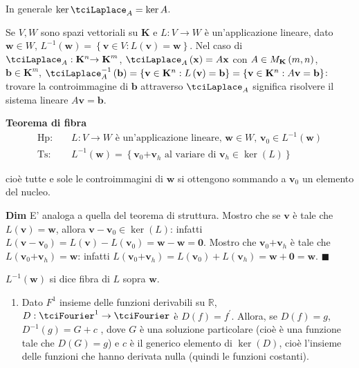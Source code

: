 \documentclass{article}
\begin{document}
In generale $\ker \tciLaplace _{A}=\ker A$.

Se $V,W$ sono spazi vettoriali su $\mathbf{K}$ e $L:V\rightarrow W$ \`{e}
un'applicazione lineare, dato $\mathbf{w}\in W$, $L^{-1}\left( \mathbf{w}%
\right) =\left\{ \mathbf{v}\in V:L\left( \mathbf{v}\right) =\mathbf{w}%
\right\} $. Nel caso di $\tciLaplace _{A}:\mathbf{K}^{n}\mathbf{\rightarrow K%
}^{m}$, $\tciLaplace _{A}\left( \mathbf{x}\right) =A\mathbf{x}$ con $A\in M_{%
\mathbf{K}}\left( m,n\right) $, $\mathbf{b\in K}^{m}$, $\tciLaplace
_{A}^{-1}\left( \mathbf{b}\right) =\left\{ \mathbf{v}\in \mathbf{K}%
^{n}:L\left( \mathbf{v}\right) =\mathbf{b}\right\} =\left\{ \mathbf{v}\in 
\mathbf{K}^{n}:A\mathbf{v}=\mathbf{b}\right\} $: trovare la controimmagine
di $\mathbf{b}$ attraverso $\tciLaplace _{A}$ significa risolvere il sistema
lineare $A\mathbf{v}=\mathbf{b}$.

\textbf{Teorema di fibra}%
\begin{eqnarray*}
\text{Hp}\text{: } &&L:V\rightarrow W\text{ \`{e} un'applicazione lineare, }%
\mathbf{w}\in W\text{, }\mathbf{v}_{0}\in L^{-1}\left( \mathbf{w}\right) \\
\text{Ts}\text{: } &&L^{-1}\left( \mathbf{w}\right) =\left\{ \mathbf{v}_{0}%
\mathbf{+v}_{h}\text{ al variare di }\mathbf{v}_{h}\in \ker \left( L\right)
\right\}
\end{eqnarray*}

cio\`{e} tutte e sole le controimmagini di $\mathbf{w}$ si ottengono
sommando a $\mathbf{v}_{0}$ un elemento del nucleo.

\textbf{Dim} E' analoga a quella del teorema di struttura. Mostro che se $%
\mathbf{v}$ \`{e} tale che $L\left( \mathbf{v}\right) =\mathbf{w}$, allora $%
\mathbf{v-v}_{0}\in \ker \left( L\right) $: infatti $L\left( \mathbf{v-v}%
_{0}\right) =L\left( \mathbf{v}\right) -L\left( \mathbf{v}_{0}\right) =%
\mathbf{w-w=0}$. Mostro che $\mathbf{v}_{0}\mathbf{+v}_{h}$ \`{e} tale che $%
L\left( \mathbf{v}_{0}\mathbf{+v}_{h}\right) =\mathbf{w}$: infatti $L\left( 
\mathbf{v}_{0}\mathbf{+v}_{h}\right) =L\left( \mathbf{v}_{0}\right) +L\left( 
\mathbf{v}_{h}\right) =\mathbf{w+0=w}$. $\blacksquare $

$L^{-1}\left( \mathbf{w}\right) $ si dice fibra di $L$ sopra $\mathbf{w}$.

\begin{enumerate}
\item Dato $F^{1}$ insieme delle funzioni derivabili su $%
\mathbb{R}
$, $D:\tciFourier ^{1}\rightarrow \tciFourier $ \`{e} $D\left( f\right)
=f^{\prime }$. Allora, se $D\left( f\right) =g$, $D^{-1}\left( g\right) =G+c$%
, dove $G$ \`{e} una soluzione particolare (cio\`{e} \`{e} una funzione tale
che $D\left( G\right) =g$) e $c$ \`{e} il generico elemento di $\ker \left(
D\right) $, cio\`{e} l'insieme delle funzioni che hanno derivata nulla
(quindi le funzioni costanti).
\end{enumerate}
\end{document}
